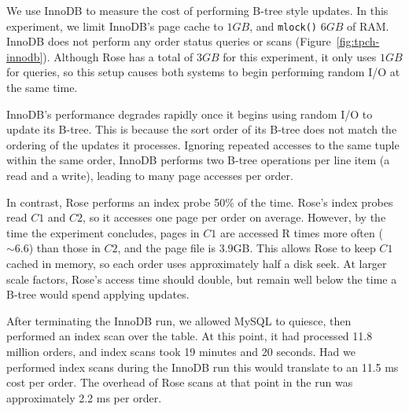 \documentclass{vldb}
\newcommand{\rows}{Rose\xspace}
\newcommand{\rowss}{Rose's\xspace}
\begin{document}
We use InnoDB to measure the cost of performing B-tree style updates.
In this experiment, we limit InnoDB's page cache to $1GB$, and {\tt mlock()} $6GB$
of RAM.  InnoDB does not perform any order status queries or scans (Figure~\ref{fig:tpch-innodb}).
Although \rows has a total of $3GB$ for this
experiment, it only uses $1GB$ for queries, so this setup causes both
systems to begin performing random I/O at the same time.

InnoDB's performance degrades rapidly once it begins using random I/O
to update its B-tree.  This is because the sort order of its B-tree
does not match the ordering of the updates it processes.  Ignoring
repeated accesses to the same tuple within the same order, InnoDB
performs two B-tree operations per line item (a read and a write),
leading to many page accesses per order.

In contrast, \rows performs an index probe 50\% of the time.  \rowss
index probes read $C1$ and $C2$, so it accesses one page per order on
average.  However, by the time the experiment concludes, pages in $C1$
are accessed R times more often ($\sim6.6$) than those in $C2$, and
the page file is 3.9GB.  This allows \rows to keep $C1$ cached in
memory, so each order uses approximately half a disk seek.  At larger
scale factors, \rowss access time should double, but remain well
below the time a B-tree would spend applying updates.

After terminating the InnoDB run, we allowed MySQL to quiesce, then
performed an index scan over the table.  At this point, it had
processed 11.8 million orders, and index scans took 19 minutes and 20
seconds.  Had we performed index scans during the InnoDB run this
would translate to an 11.5 ms cost per order. The overhead of \rows
scans at that point in the run was approximately 2.2 ms per order.

%
\end{document}
